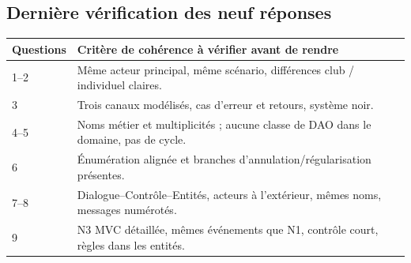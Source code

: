 \subsection{Dernière vérification des neuf réponses}
\begin{tabularx}{\linewidth}{@{}p{24mm}X@{}}\toprule
Questions & Critère de cohérence à vérifier avant de rendre \\\midrule
1--2 & Même acteur principal, même scénario, différences club / individuel claires.\\
3 & Trois canaux modélisés, cas d'erreur et retours, système noir.\\
4--5 & Noms métier et multiplicités ; aucune classe de DAO dans le domaine, pas de cycle.\\
6 & Énumération alignée et branches d'annulation/régularisation présentes.\\
7--8 & Dialogue--Contrôle--Entités, acteurs à l'extérieur, mêmes noms, messages numérotés.\\
9 & N3 MVC détaillée, mêmes événements que N1, contrôle court, règles dans les entités.\\\bottomrule\end{tabularx}